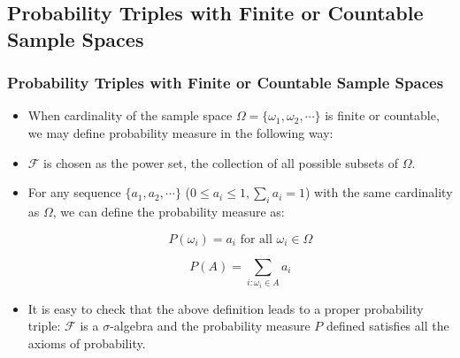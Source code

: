 \documentclass[handout]{beamer}
\begin{document}
\subsection{Probability Triples with Finite or Countable Sample Spaces}
\frame
{
  \frametitle{Probability Triples with Finite or Countable Sample Spaces}

   \begin{itemize}

      
       \item<1-> When cardinality of the sample space $\Omega=\{\omega_1, \omega_2,\cdots\}$ is finite or countable, we may define probability measure in the following way:  
       

             \item<2-> $\mathcal{F}$ is chosen  as the power set, the collection of all possible subsets of $\Omega$. 
             
                     \item<3-> For any sequence $\{a_1, a_2, \cdots\}$ ($0\leq a_i \leq 1, \sum_i a_i=1$) with the same cardinality as $\Omega$, we can define the probability measure as:
                     
                    $$P(\omega_i)=a_i \text{ for all } \omega_i \in \Omega$$
                     
                     $$P(A)=\sum_{i: \omega_i \in A} a_i$$
                                          
            
             
              \item<4-> It is easy to check that the above definition leads to a proper probability triple: $\mathcal{F}$ is a $\sigma$-algebra and the probability measure $P$ defined  satisfies all the axioms of probability. 
                              \end{itemize}
}
\end{document}
